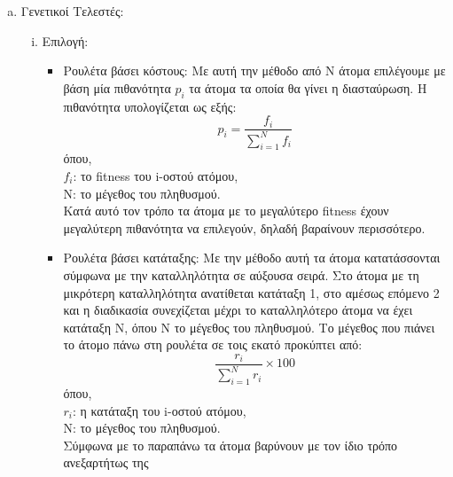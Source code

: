 \documentclass[12pt,a4paper]{article}
\newcommand{\tl}{\textlatin}
\begin{document}
\begin{enumerate}[a)]
                \item Γενετικοί Τελεστές:
                    \begin{enumerate}[i.]
                        \item Επιλογή:
                        \begin{itemize}
                                \item Ρουλέτα βάσει κόστους: Με αυτή την μέθοδο από Ν 
                                    άτομα επιλέγουμε με βάση μία 
                                    πιθανότητα \tl{$p_i$} τα άτομα τα οποία θα γίνει η διασταύρωση. Η 
                                    πιθανότητα υπολογίζεται ως εξής: 
                                    $$ p_i = \frac{f_i}{\sum_{i=1}^{N}f_i}$$
                                     όπου, \\ $f_i$: το \tl{fitness} του \tl{i}-οστού ατόμου,\\
                                    Ν: το μέγεθος του πληθυσμού.
                                    \\ Κατά αυτό τον τρόπο τα άτομα με το μεγαλύτερο \tl{fitness} 
                                    έχουν μεγαλύτερη πιθανότητα να επιλεγούν, δηλαδή βαραίνουν περισσότερο.
                                    \item  Ρουλέτα βάσει κατάταξης: Με την μέθοδο αυτή τα 
                                        άτομα κατατάσσονται
                                        σύμφωνα με την καταλληλότητα σε αύξουσα σειρά. Στο 
                                        άτομα με τη μικρότερη 
                                        καταλληλότητα ανατίθεται κατάταξη 1, στο αμέσως επόμενο 2
                                        και η διαδικασία συνεχίζεται μέχρι το
                                        καταλληλότερο άτομα να έχει κατάταξη Ν, όπου 
                                        Ν το μέγεθος του πληθυσμού.
                                        Το μέγεθος που πιάνει το άτομο πάνω στη ρουλέτα σε 
                                        τοις εκατό προκύπτει από:
                                        $$\frac{r_i}{\sum_{i=1}^{N}r_i}\times100$$
                                        όπου,
                                        \\ $r_i$: η κατάταξη του \tl{i}-οστού ατόμου,\\ 
                                        Ν: το μέγεθος του πληθυσμού.
                                        \\ Σύμφωνα με το παραπάνω τα άτομα βαρύνουν με 
                                        τον ίδιο τρόπο ανεξαρτήτως της

\end{itemize}
\end{enumerate}
\end{enumerate}
\end{document}
